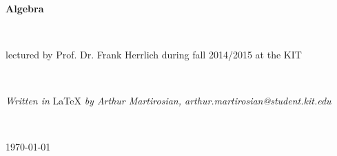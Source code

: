 \documentclass[11pt]{book}
\theoremstyle{nonumberbreak}
\begin{document}
\begin{titlepage}

\textrm{ }\\[64pt]

\begin{center}
{\fontsize{40}{40} \selectfont \textbf{Algebra}}
\end{center}
\textrm{ } \\[36pt]
\begin{center} \large{\textrm{lectured by Prof. Dr. Frank Herrlich during fall 2014/2015 at the KIT}} \end{center}
\textrm{ } \\[320pt]
\begin{center} \large{\textit{Written in } \LaTeX \textit{ by Arthur Martirosian, arthur.martirosian@student.kit.edu}}\end{center}
\textrm{ }\\[24pt]
\begin{center} \large{\today} \end{center}

\end{titlepage}
\thispagestyle{empty}



\begin{spacing}{1.7}
\setcounter{tocdepth}{1}
\tableofcontents
\thispagestyle{empty}
\end{spacing}
\newpage
\end{document}

